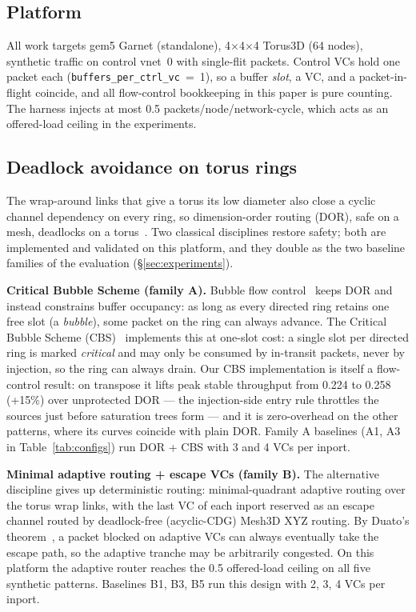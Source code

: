 \documentclass[10pt]{article}
\begin{document}
\subsection{Platform}

All work targets gem5 Garnet (standalone), 4$\times$4$\times$4 Torus3D
(64 nodes), synthetic traffic on control vnet~0 with single-flit
packets. Control VCs hold one packet each
(\texttt{buffers\_per\_ctrl\_vc}~=~1), so a buffer \emph{slot}, a VC, and
a packet-in-flight coincide, and all flow-control bookkeeping in this
paper is pure counting. The harness injects at most 0.5
packets/node/network-cycle, which acts as an offered-load ceiling in the
experiments.

\subsection{Deadlock avoidance on torus rings}

The wrap-around links that give a torus its low diameter also close a
cyclic channel dependency on every ring, so dimension-order routing
(DOR), safe on a mesh, deadlocks on a torus~\cite{dallytowles}. Two
classical disciplines restore safety; both are implemented and validated
on this platform, and they double as the two baseline families of the
evaluation (\S\ref{sec:experiments}).

\textbf{Critical Bubble Scheme (family A).} Bubble flow
control~\cite{dallytowles} keeps DOR and instead constrains buffer
occupancy: as long as every directed ring retains one free slot (a
\emph{bubble}), some packet on the ring can always advance. The Critical
Bubble Scheme (CBS)~\cite{chen2011} implements this at one-slot cost:
a single slot per directed ring is marked \emph{critical} and may only
be consumed by in-transit packets, never by injection, so the ring can
always drain. Our CBS implementation is itself a flow-control result:
on transpose it lifts peak stable throughput from 0.224 to 0.258
(+15\%) over unprotected DOR --- the injection-side entry rule throttles
the sources just before saturation trees form --- and it is
zero-overhead on the other patterns, where its curves coincide with
plain DOR. Family A baselines (A1, A3 in Table~\ref{tab:configs}) run
DOR + CBS with 3 and 4 VCs per inport.

\textbf{Minimal adaptive routing + escape VCs (family B).} The
alternative discipline gives up deterministic routing: minimal-quadrant
adaptive routing over the torus wrap links, with the last VC of each
inport reserved as an escape channel routed by deadlock-free
(acyclic-CDG) Mesh3D XYZ routing. By Duato's
theorem~\cite{dally1987,duato1993}, a packet blocked on adaptive VCs can
always eventually take the escape path, so the adaptive tranche may be
arbitrarily congested. On this platform the adaptive router reaches the
0.5 offered-load ceiling on all five synthetic patterns. Baselines B1,
B3, B5 run this design with 2, 3, 4 VCs per inport.
\end{document}
